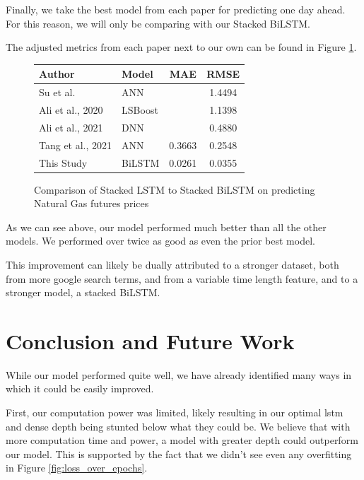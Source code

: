\documentclass[final]{cvpr}
\begin{document}
    Finally, we take the best model from each paper for predicting one day 
    ahead. For this reason, we will only be comparing with our Stacked BiLSTM.

    The adjusted metrics from each paper next to our own can be found in Figure 
    \ref{fig:comparisons}.

    \begin{figure}[h]
        \caption{Comparison of Stacked LSTM to Stacked BiLSTM on predicting
            Natural Gas futures prices}
        \center
        \begin{tabular}{| p{2.5cm} | p{2cm} || c | c |}
            \hline
            Author & Model & MAE & RMSE\\
            \hline
            \hline
            Su et al. \cite{su}                 & ANN       & & 1.4494\\
            \hline
            Ali et al., 2020 \cite{ali2020}     & LSBoost   & & 1.1398\\
            \hline
            Ali et al., 2021 \cite{ali2021}     & DNN       & & 0.4880\\
            \hline
            Tang et al., 2021 \cite{tang}       & ANN       & 0.3663 & 0.2548\\
            \hline
            \hline
            This Study                      & BiLSTM & 0.0261 & 0.0355\\
            \hline
        \end{tabular}
        \label{fig:comparisons}
    \end{figure}

    As we can see above, our model performed much better than all the other 
    models. We performed over twice as good as even the prior best model.

    This improvement can likely be dually attributed to a stronger dataset,
    both from more google search terms, and from a variable time length feature,
    and to a stronger model, a stacked BiLSTM.

\section{Conclusion and Future Work}

    While our model performed quite well, we have already identified many ways
    in which it could be easily improved. 

    First, our computation power was limited, likely resulting in our optimal 
    lstm and dense depth being stunted below what they could be. We believe
    that with more computation time and power, a model with greater depth could
    outperform our model. This is supported by the fact that we didn't see even
    any overfitting in Figure \ref{fig:loss_over_epochs}.
\end{document}
